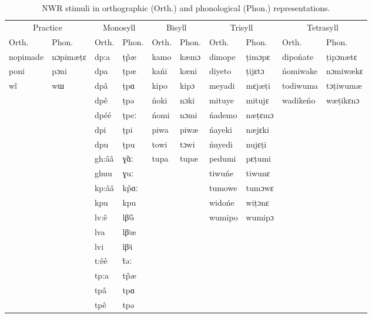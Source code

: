 \documentclass[english,,man,floatsintext]{apa6}
\begin{document}
\begin{table}

\caption{\label{tab:tabstims}NWR stimuli in orthographic (Orth.) and phonological (Phon.) representations.}
\centering
\begin{tabular}[t]{llllllllll}
\toprule
\multicolumn{2}{c}{Practice} & \multicolumn{2}{c}{Monosyll} & \multicolumn{2}{c}{Bisyll} & \multicolumn{2}{c}{Trisyll} & \multicolumn{2}{c}{Tetrasyll} \\
\cmidrule(l{3pt}r{3pt}){1-2} \cmidrule(l{3pt}r{3pt}){3-4} \cmidrule(l{3pt}r{3pt}){5-6} \cmidrule(l{3pt}r{3pt}){7-8} \cmidrule(l{3pt}r{3pt}){9-10}
Orth. & Phon. & Orth. & Phon. & Orth. & Phon. & Orth. & Phon. & Orth. & Phon.\\
\midrule
nopimade & nɔpimæṭɛ & dp:a & ṭp̃æ & kamo & kæmɔ & dimope & ṭimɔpɛ & dipońate & ṭipɔnætɛ\\
poni & pɔni & dpa & ṭpæ & kańi & kæni & diyeto & ṭijɛtɔ & ńomiwake & nɔmiwækɛ\\
wî & wɯ & dpâ & ṭpɑ & kipo & kipɔ & meyadi & mɛjæṭi & todiwuma & tɔṭiwumæ\\
 &  & dpê & ṭpə & ńoki & nɔki & mituye & mitujɛ & wadikeńo & wæṭikɛnɔ\\
 &  & dpéé & ṭpeː & ńomi & nɔmi & ńademo & næṭɛmɔ &  & \\
\addlinespace
 &  & dpi & ṭpi & piwa & piwæ & ńayeki & næjɛki &  & \\
 &  & dpu & ṭpu & towi & tɔwi & ńuyedi & nujɛṭi &  & \\
 &  & gh:ââ & ɣ̃ɑː & tupa & tupæ & pedumi & pɛṭumi &  & \\
 &  & ghuu & ɣuː &  &  & tiwuńe & tiwunɛ &  & \\
 &  & kp:ââ & kp̃ɑː &  &  & tumowe & tumɔwɛ &  & \\
\addlinespace
 &  & kpu & kpu &  &  & widońe & wiṭɔnɛ &  & \\
 &  & lv:ê & lβʲ̃ə &  &  & wumipo & wumipɔ &  & \\
 &  & lva & lβʲæ &  &  &  &  &  & \\
 &  & lvi & lβʲi &  &  &  &  &  & \\
 &  & t:êê & t̃əː &  &  &  &  &  & \\
\addlinespace
 &  & tp:a & tp̃æ &  &  &  &  &  & \\
 &  & tpâ & tpɑ &  &  &  &  &  & \\
 &  & tpê & tpə &  &  &  &  &  & \\
\bottomrule
\end{tabular}
\end{table}
\end{document}
